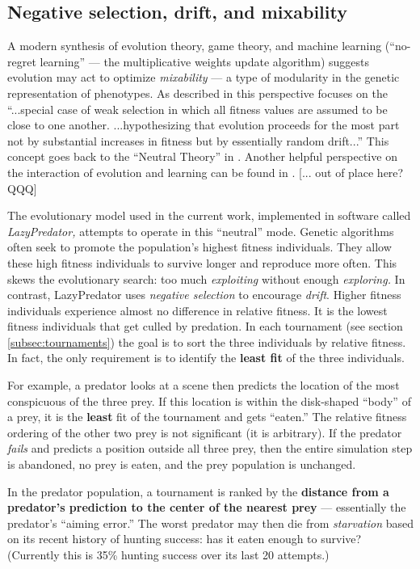 \documentclass[sigconf]{acmart}
\newcommand{\jargon}[1]{\textit{#1}}
\begin{document}
\subsection{Negative selection, drift, and mixability}

A modern synthesis \cite{livnat_sex_2016} of evolution theory, game theory, and machine learning (“no-regret learning” — the multiplicative weights update algorithm) suggests evolution may act to optimize \jargon{mixability} — a type of modularity in the genetic representation of phenotypes. As described in \citet{chastain_multiplicative_2013} this perspective focuses on the “...special case of weak selection in which all fitness values are assumed to be close to one another. ...hypothesizing that evolution proceeds for the most part not by substantial increases in fitness but by essentially random drift...” This concept goes back to the “Neutral Theory” in \citet{kimura_evolutionary_1968}. Another helpful perspective on the interaction of evolution and learning can be found in \citet{valiant_probably_2013}. [... out of place here? QQQ]
\par
The evolutionary model used in the current work, implemented in software called \jargon{LazyPredator,} attempts to operate in this “neutral” mode. Genetic algorithms often seek to promote the population's highest fitness individuals. They allow these high fitness individuals to survive longer and reproduce more often. This skews the evolutionary search: too much \jargon{exploiting} without enough \jargon{exploring.}  In contrast, LazyPredator uses \textit{negative selection} to encourage \jargon{drift}. Higher fitness individuals experience almost no difference in  relative fitness. It is the lowest fitness individuals that get culled by predation. In each tournament (see section \ref{subsec:tournaments}) the goal is to sort the three individuals by relative fitness. In fact, the only requirement is to identify the \textbf{least fit} of the three individuals.
\par 
For example, a predator looks at a scene then predicts the location of the most conspicuous of the three prey. If this location is within the disk-shaped “body” of a prey, it is the \textbf{least} fit of the tournament and gets “eaten.” The relative fitness ordering of the other two prey is not significant (it is arbitrary). If the predator \jargon{fails} and predicts a position outside all three prey, then the entire simulation step is abandoned, no prey is eaten, and the prey population is unchanged.
\par
In the predator population, a tournament is ranked by the \textbf{distance from a predator's prediction to the center of the nearest prey} — essentially the predator's “aiming error.” The worst predator may then die from \jargon{starvation} based on its recent history of hunting success: has it eaten enough to survive? (Currently this is 35\% hunting success over its last 20 attempts.)
\end{document}
